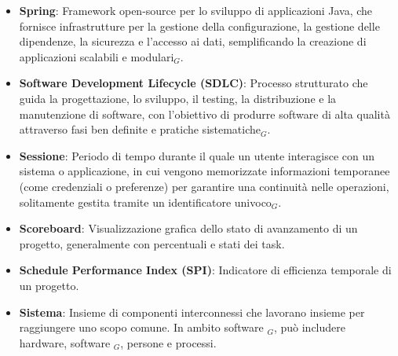 \begin{itemize}
\item \textbf{Spring}: Framework open-source per lo sviluppo di applicazioni Java, che fornisce infrastrutture per la gestione della configurazione, la gestione delle dipendenze, la sicurezza e l'accesso ai dati, semplificando la creazione di applicazioni scalabili e modulari$_G$.
\item \textbf{Software Development Lifecycle (SDLC)}: Processo strutturato che guida la progettazione, lo sviluppo, il testing, la distribuzione e la manutenzione di software, con l'obiettivo di produrre software di alta qualità attraverso fasi ben definite e pratiche sistematiche$_G$.
\item \textbf{Sessione}: Periodo di tempo durante il quale un utente interagisce con un sistema o applicazione, in cui vengono memorizzate informazioni temporanee (come credenziali o preferenze) per garantire una continuità nelle operazioni, solitamente gestita tramite un identificatore univoco$_G$.
\item \textbf{Scoreboard}: Visualizzazione grafica dello stato di avanzamento di un progetto, generalmente con percentuali e stati dei task.
\item \textbf{Schedule Performance Index (SPI)}: Indicatore di efficienza temporale di un progetto.
\item \textbf{Sistema}: Insieme di componenti interconnessi che lavorano insieme per raggiungere uno scopo comune. In ambito software $_G$, può includere hardware, software $_G$, persone e processi.
\end{itemize}
